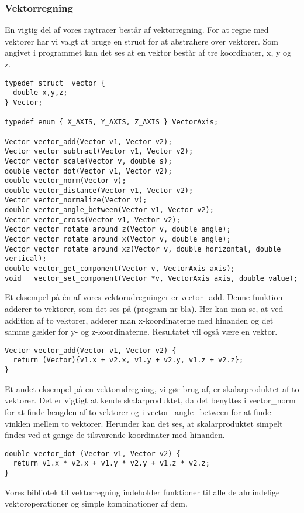 \subsubsection{Vektorregning}
En vigtig del af vores raytracer består af vektorregning. For at regne med vektorer har vi valgt at bruge en struct for at abstrahere over vektorer. Som angivet i programmet kan det ses at en vektor består af tre koordinater, x, y og z. 

\begin{lstlisting}[style=Cstyle, caption=Vektorprototyper og struct]
typedef struct _vector {
  double x,y,z;
} Vector;

typedef enum { X_AXIS, Y_AXIS, Z_AXIS } VectorAxis;

Vector vector_add(Vector v1, Vector v2);
Vector vector_subtract(Vector v1, Vector v2);
Vector vector_scale(Vector v, double s);
double vector_dot(Vector v1, Vector v2);
double vector_norm(Vector v);
double vector_distance(Vector v1, Vector v2);
Vector vector_normalize(Vector v);
double vector_angle_between(Vector v1, Vector v2);
Vector vector_cross(Vector v1, Vector v2);
Vector vector_rotate_around_z(Vector v, double angle);
Vector vector_rotate_around_x(Vector v, double angle);
Vector vector_rotate_around_xz(Vector v, double horizontal, double vertical);
double vector_get_component(Vector v, VectorAxis axis);
void   vector_set_component(Vector *v, VectorAxis axis, double value);
\end{lstlisting}

Et eksempel på én af vores vektorudregninger er vector\_add. Denne funktion adderer to vektorer, som det ses på (program nr bla). Her kan man se, at ved addition af to vektorer, adderer man x-koordinaterne med hinanden og det samme gælder for y- og z-koordinaterne. Resultatet vil også være en vektor.

\begin{lstlisting}[style=Cstyle, caption=vector add]
Vector vector_add(Vector v1, Vector v2) {
  return (Vector){v1.x + v2.x, v1.y + v2.y, v1.z + v2.z};
}
\end{lstlisting}

Et andet eksempel på en vektorudregning, vi gør brug af, er skalarproduktet af to vektorer. Det er vigtigt at kende skalarproduktet, da det benyttes i vector\_norm for at finde længden af to vektorer og i vector\_angle\_between for at finde vinklen mellem to vektorer. Herunder kan det ses, at skalarproduktet simpelt findes ved at gange de tilsvarende koordinater med hinanden.

\begin{lstlisting}[style=Cstyle, caption=vector dot]
double vector_dot (Vector v1, Vector v2) {
  return v1.x * v2.x + v1.y * v2.y + v1.z * v2.z;
}
\end{lstlisting}

Vores bibliotek til vektorregning indeholder funktioner til alle de almindelige vektoroperationer og simple kombinationer af dem.